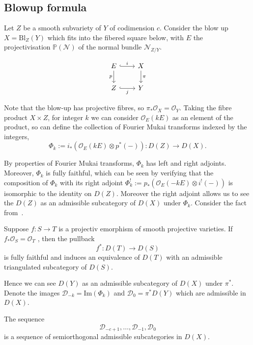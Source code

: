 \subsection{Blowup formula}

Let $Z$ be a smooth subvariety of $Y$ of codimension $c$. Consider the blow up $X = \mathrm{Bl}_{Z}(Y)$ which fits into the fibered square below, with $E$ the projectivisation $\mathbb{P} (\mathcal{N})$ of the normal bundle $\mathcal{N}_{Z/Y}$. 

\[\begin{tikzcd}[column sep=2.25em]
	{E } & X \\
	Z & {Y}
	\arrow["p"', from=1-1, to=2-1]
	\arrow["\pi", from=1-2, to=2-2]
	\arrow["i", hook, from=1-1, to=1-2]
	\arrow["j"', hook, from=2-1, to=2-2]
\end{tikzcd}\]

Note that the blow-up has projective fibres, so $\pi_{*}\mathcal{O}_{X}= \mathcal{O}_Y$. Taking the fibre product $X \times Z$, for integer $k$ we can consider $\mathcal{O}_{E}(kE)$ as an element of the product, so can define the collection of Fourier Mukai transforms indexed by the integers, $$\Phi_{k}:= i_{*}\left( \mathcal{O}_{E}(kE)\otimes p^{*}(- ) \right): D(Z)\to D(X).$$

By properties of Fourier Mukai transforms, $\Phi_k$ has left and right adjoints. Moreover, $\Phi_k$ is fully faithful, which can be seen by verifying that the composition of $\Phi_k$ with its right adjoint $\Phi_{k}^{!}:= p_{*}(\mathcal{O}_{E}(-kE)\otimes i^{!}(-))$ is isomorphic to the identity on $D(Z)$. Moreover the right adjoint allows us to see the $D(Z)$ as an admissible subcategory of $D(X)$ under $\Phi_k$. Consider the fact from~\cite*{Huybrechts}.

\begin{proposition}{}{}
    Suppose $f: S \to T$ is a projectiv emorphism of smooth projective varieties. If $f_{*}\mathcal{O}_{S} = \mathcal{O}_T$ , then the pullback $$f^{*}: D(T)\to D(S)$$is fully faithful and induces an equivalence of $D(T)$ with an admissible triangulated subcategory of $D(S)$.
\end{proposition}

Hence we can see $D(Y)$ as an admissible subcategory of $D(X)$ under $\pi^*$. Denote the images $\mathcal{D}_{-k}=\mathrm{Im}(\Phi_{k})$ and $\mathcal{D}_{0}= \pi^{*}D(Y)$ which are admissible in $D(X)$. 

\begin{lemma}{}{}
    The sequence $$\mathcal{D}_{-c+1},\dots,\mathcal{D}_{-1},\mathcal{D}_0$$is a sequence of semiorthogonal admissible subcategories in $D(X)$.
\end{lemma}


